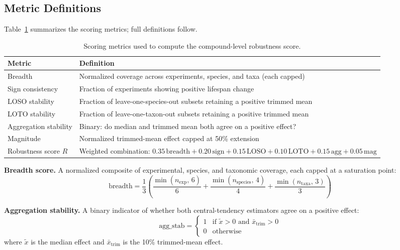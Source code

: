 \documentclass[11pt]{article}
\begin{document}
\subsection{Metric Definitions}

Table~\ref{tab:notation} summarizes the scoring metrics; full definitions follow.

\begin{table}[t]
\centering
\small
\begin{tabular}{lp{6.5cm}}
\toprule
Metric & Definition \\
\midrule
Breadth & Normalized coverage across experiments, species, and taxa (each capped) \\
Sign consistency & Fraction of experiments showing positive lifespan change \\
LOSO stability & Fraction of leave-one-species-out subsets retaining a positive trimmed mean \\
LOTO stability & Fraction of leave-one-taxon-out subsets retaining a positive trimmed mean \\
Aggregation stability & Binary: do median and trimmed mean both agree on a positive effect? \\
Magnitude & Normalized trimmed-mean effect capped at 50\% extension \\
Robustness score $R$ & Weighted combination: $0.35\,\text{breadth} + 0.20\,\text{sign} + 0.15\,\text{LOSO} + 0.10\,\text{LOTO} + 0.15\,\text{agg} + 0.05\,\text{mag}$ \\
\bottomrule
\end{tabular}
\caption{Scoring metrics used to compute the compound-level robustness score.}
\label{tab:notation}
\end{table}

\textbf{Breadth score.} A normalized composite of experimental, species, and taxonomic coverage, each capped at a saturation point:
\[
  \text{breadth} = \frac{1}{3}\!\left(\frac{\min(n_{\text{exp}},\,6)}{6} + \frac{\min(n_{\text{species}},\,4)}{4} + \frac{\min(n_{\text{taxa}},\,3)}{3}\right)
\]

\textbf{Aggregation stability.} A binary indicator of whether both central-tendency estimators agree on a positive effect:
\[
  \text{agg\_stab} = \begin{cases} 1 & \text{if } \tilde{x} > 0 \text{ and } \bar{x}_{\text{trim}} > 0 \\ 0 & \text{otherwise} \end{cases}
\]
where \(\tilde{x}\) is the median effect and \(\bar{x}_{\text{trim}}\) is the 10\% trimmed-mean effect.
\end{document}
